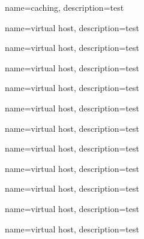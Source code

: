 {
	name={caching},
	description={test}
}

{
	name={virtual host},
	description={test}
}

{
	name={virtual host},
	description={test}
}

{
	name={virtual host},
	description={test}
}

{
	name={virtual host},
	description={test}
}

{
	name={virtual host},
	description={test}
}

{
	name={virtual host},
	description={test}
}

{
	name={virtual host},
	description={test}
}

{
	name={virtual host},
	description={test}
}

{
	name={virtual host},
	description={test}
}

{
	name={virtual host},
	description={test}
}

{
	name={virtual host},
	description={test}
}
